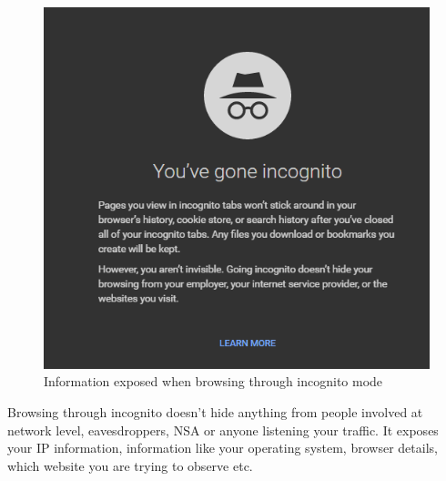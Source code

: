 \documentclass{article}
\begin{document}
      \begin{figure}[h!]
        \includegraphics[width=\linewidth]{incognito_mode.png}
        \caption{Information exposed when browsing through incognito mode}
        \label{fig:incognito_mode}
      \end{figure}

      Browsing through incognito doesn't hide anything from people involved at
      network level, eavesdroppers, NSA or anyone listening your traffic. It
      exposes your IP information, information like your operating system,
      browser details, which website you are trying to observe etc.
\end{document}
